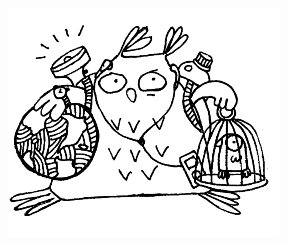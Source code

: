 \documentclass[11pt,a5paper]{book}
\begin{document}
\newpage
\raggedright

\centering\includegraphics[scale=0.5]{11}
\end{document}
